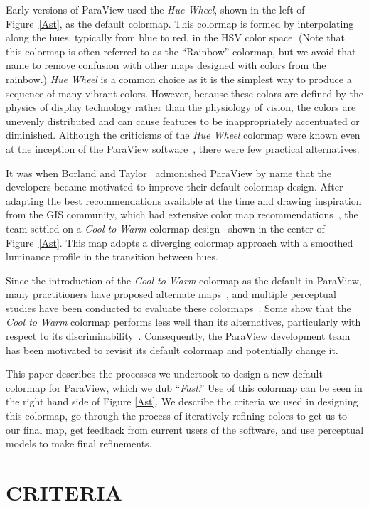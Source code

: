 \documentclass{IEEEcsmag}
\newcommand*{\colormap}[1]{\textsl{#1}\xspace}
\newcommand*{\huewheel}{\colormap{Hue Wheel}}
\newcommand*{\coolwarm}{\colormap{Cool to Warm}}
\newcommand*{\fast}{\colormap{Fast}}
\begin{document}
Early versions of ParaView used the \huewheel, shown in the left of Figure~\ref{Ast}, as the default colormap.
This colormap is formed by interpolating along the hues, typically from blue to red, in the HSV color space.
(Note that this colormap is often referred to as the ``Rainbow'' colormap, but we avoid that name to remove confusion with other maps designed with colors from the rainbow.)
\huewheel is a common choice as it is the simplest way to produce a sequence of many vibrant colors.
However, because these colors are defined by the physics of display technology rather than the physiology of vision, the colors are unevenly distributed and can cause features to be inappropriately accentuated or diminished.
Although the criticisms of the \huewheel colormap were known even at the inception of the ParaView software~\cite{Rogowitz1998}, there were few practical alternatives.

It was when Borland and Taylor~\cite{Borland2007} admonished ParaView by name that the developers became motivated to improve their default colormap design.
After adapting the best recommendations available at the time and drawing inspiration from the GIS community, which had extensive color map recommendations~\cite{Brewer2003}, the team settled on a \coolwarm colormap design~\cite{Moreland2009} shown in the center of Figure~\ref{Ast}.
This map adopts a diverging colormap approach with a smoothed luminance profile in the transition between hues. 

Since the introduction of the \coolwarm colormap as the default in ParaView, many practitioners have proposed alternate maps~\cite{Samsel2015}, and multiple perceptual studies have been conducted to evaluate these colormaps~\cite{Ware2017}.
Some show that the \coolwarm colormap performs less well than its alternatives, particularly with respect to its discriminability~\cite{Ware2017,Ware2019}.
Consequently, the ParaView development team has been motivated to revisit its default colormap and potentially change it.

This paper describes the processes we undertook to design a new default colormap for ParaView, which we dub ``\fast.''
Use of this colormap  can be seen in the right hand side of Figure \ref{Ast}.
We describe the criteria we used in designing this colormap, go through the process of iteratively refining colors to get us to our final map, get feedback from current users of the software, and use perceptual models to make final refinements.


\section{CRITERIA}
\end{document}

